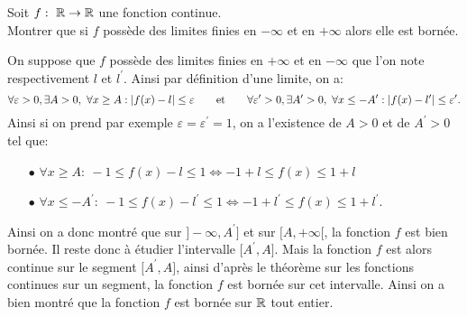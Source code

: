 \documentclass[a4paper, 11pt,reqno]{article}
\begin{document}
\begin{exercice}  \;
	Soit $f:\ \mathbb{R}\rightarrow \mathbb{R}$ une fonction continue.\\
	\noindent Montrer que si $f$ poss\`ede des limites finies en $-\infty$ et en $+\infty$ alors elle est born\'ee.
\end{exercice}
\begin{correction}  \;
	On suppose que $f$ poss\`{e}de des limites finies en $+\infty$ et en $-\infty$ que l'on note respectivement $l$ et $l^{\prime}$. Ainsi par d\'efinition d'une limite, on a:
	$$\forall \varepsilon>0,\exists A>0,\ \forall x\geq A: |f(x)-l|\leq \varepsilon\qquad \hbox{et}\qquad \forall \varepsilon^{\prime}>0,\exists A^{\prime}>0,\ \forall x\leq -A^{\prime}: |f(x)-l^{\prime}|\leq \varepsilon^{\prime}.$$
	Ainsi si on prend par exemple $\varepsilon=\varepsilon^{\prime}=1$, on a l'existence de $A>0$ et de $A^{\prime}>0$ tel que:
	\begin{itemize}
		\item[$\bullet$] $\forall x\geq A:\ -1\leq f(x)-l\leq 1\Leftrightarrow -1+l\leq f(x)\leq 1+l$
		\item[$\bullet$] $\forall x\leq -A^{\prime}:\ -1\leq f(x)-l^{\prime}\leq 1\Leftrightarrow -1+l^{\prime}\leq f(x)\leq 1+l^{\prime}$.
	\end{itemize}
	Ainsi on a donc montr\'e que sur $\rbrack -\infty, A^{\prime}\rbrack$ et sur $\lbrack A,+\infty\lbrack$, la fonction $f$ est bien born\'ee. Il reste donc \`{a} \'etudier l'intervalle $\lbrack A^{\prime},A\rbrack$. Mais la fonction $f$ est alors continue sur le segment $\lbrack A^{\prime},A\rbrack$, ainsi d'apr\`{e}s le th\'eor\`{e}me sur les fonctions continues sur un segment, la fonction $f$ est born\'ee sur cet intervalle. Ainsi on a bien montr\'e que la fonction $f$ est born\'ee sur $\mathbb{R}$ tout entier.
\end{correction}
\end{document}
